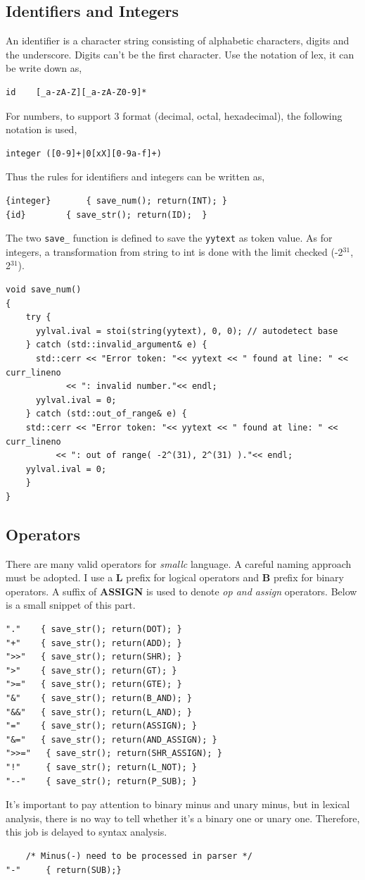 \documentclass[11pt]{article}
\begin{document}
\subsection{Identifiers and Integers}
\label{sec:orgheadline2}
An identifier is a character string consisting of alphabetic characters, digits
and the underscore. Digits can't be the first character. Use the notation of
lex, it can be write down as,
\begin{verbatim}
id    [_a-zA-Z][_a-zA-Z0-9]*
\end{verbatim}
For numbers, to support 3 format (decimal, octal, hexadecimal), the following
notation is used,
\begin{verbatim}
integer ([0-9]+|0[xX][0-9a-f]+)
\end{verbatim}
Thus the rules for identifiers and integers can be written as,
\begin{verbatim}
{integer}       { save_num(); return(INT); }
{id}        { save_str(); return(ID);  }
\end{verbatim}
The two \texttt{save\_} function is defined to save the \texttt{yytext} as token value. As for
integers, a transformation from string to int is done with the limit checked
(-2\(^{\text{31}}\), 2\(^{\text{31}}\)).
\begin{verbatim}
void save_num()
{
    try {
      yylval.ival = stoi(string(yytext), 0, 0); // autodetect base
    } catch (std::invalid_argument& e) {
      std::cerr << "Error token: "<< yytext << " found at line: " << curr_lineno
            << ": invalid number."<< endl;
      yylval.ival = 0;
    } catch (std::out_of_range& e) {
    std::cerr << "Error token: "<< yytext << " found at line: " << curr_lineno
          << ": out of range( -2^(31), 2^(31) )."<< endl;
    yylval.ival = 0;
    }
}
\end{verbatim}
\subsection{Operators}
\label{sec:orgheadline3}
There are many valid operators for \emph{smallc} language. A careful naming approach
must be adopted. I use a \textbf{L} prefix for logical operators and \textbf{B} prefix for
binary operators. A suffix of \textbf{ASSIGN} is used to denote \emph{op and assign}
operators. Below is a small snippet of this part.
\begin{verbatim}
"."    { save_str(); return(DOT); }
"+"    { save_str(); return(ADD); }
">>"   { save_str(); return(SHR); }
">"    { save_str(); return(GT); }
">="   { save_str(); return(GTE); }
"&"    { save_str(); return(B_AND); }
"&&"   { save_str(); return(L_AND); }
"="    { save_str(); return(ASSIGN); }
"&="   { save_str(); return(AND_ASSIGN); }
">>="   { save_str(); return(SHR_ASSIGN); }
"!"     { save_str(); return(L_NOT); }
"--"    { save_str(); return(P_SUB); }
\end{verbatim}
It's important to pay attention to binary minus and unary minus, but in lexical
analysis, there is no way to tell whether it's a binary one or unary one.
Therefore, this job is delayed to syntax analysis.
\begin{verbatim}
    /* Minus(-) need to be processed in parser */
"-"     { return(SUB);}
\end{verbatim}
\end{document}
